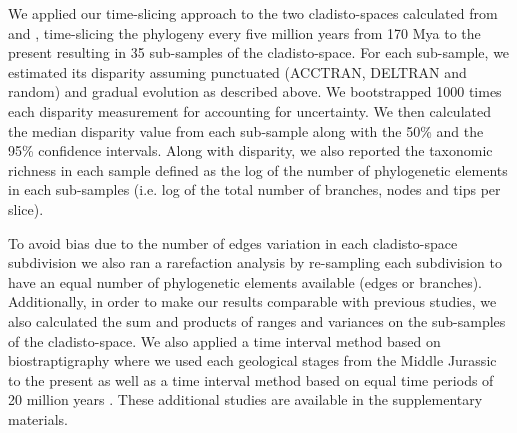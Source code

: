 \documentclass[12pt,letterpaper]{article}
\begin{document}

We applied our time-slicing approach to the two cladisto-spaces calculated from \cite{Slater2012MEE} and \cite{beckancient2014}, time-slicing the phylogeny every five million years from 170 Mya to the present resulting in 35 sub-samples of the cladisto-space.
For each sub-sample, we estimated its disparity assuming punctuated (ACCTRAN, DELTRAN and random) and gradual evolution as described above.
We bootstrapped 1000 times each disparity measurement for accounting for uncertainty.
We then calculated the median disparity value from each sub-sample along with the 50\% and the 95\% confidence intervals.
Along with disparity, we also reported the taxonomic richness in each sample defined as the log of the number of phylogenetic elements in each sub-samples (i.e. log of the total number of branches, nodes and tips per slice).


To avoid bias due to the number of edges variation in each cladisto-space subdivision we also ran a rarefaction analysis by re-sampling each subdivision to have an equal number of phylogenetic elements available (edges or branches). %
Additionally, in order to make our results comparable with previous studies, we also calculated the sum and products of ranges and variances \citep{Foote01071994,Wills1994} on the sub-samples of the cladisto-space.
We also applied a time interval method based on biostraptigraphy \citep[e.g.][]{cisneros2010,prentice2011,Hughes20082013,bentonmodels2014} where we used each geological stages from the Middle Jurassic to the present as well as a time interval method based on equal time periods of 20 million years \citep{hopkinsdecoupling2013,bensonfaunal2014}.
These additional studies are available in the supplementary materials. %
\end{document}
